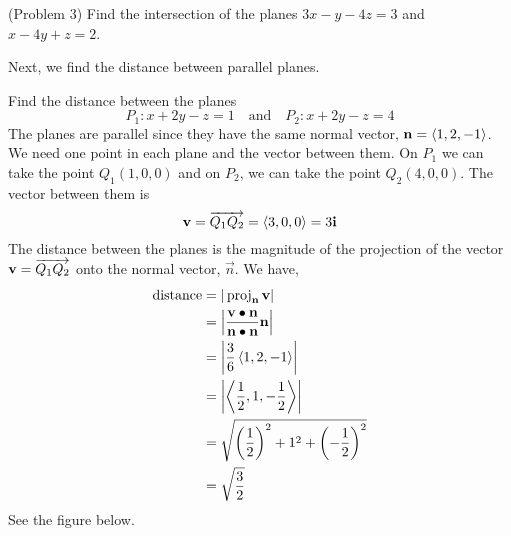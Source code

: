 \documentclass[handout]{ximera}
\begin{document}
\begin{problem}(Problem 3)
Find the intersection of the planes $3x - y -4z = 3$ and $x - 4y + z = 2$.\\
\end{problem}


Next, we find the distance between parallel planes.

\begin{example}[Example 4]
Find the distance between the planes 
\[
P_1: x +2y - z = 1 \quad \text{and} \quad P_2: x+2y-z = 4
\]
The planes are parallel since they have the same normal vector, $\mathbf{n} = \left\langle 1, 2, -1\right\rangle$. 
We need one point in each plane and the vector between them.
On $P_1$ we can take the point $Q_1(1, 0, 0)$ and on $P_2$, we can take the point $Q_2(4, 0, 0)$. 
The vector between them is 
\[
\mathbf{v} = \overrightarrow{Q_1Q_2} = \left\langle 3,0,0\right\rangle = 3\mathbf{i}
\]
The distance between the planes is the magnitude of the projection of the vector $\mathbf{v} = \overrightarrow{Q_1Q_2}$ onto the 
normal vector, $\vec{n}$. We have,
\begin{align*}
\text{distance} &= | \operatorname{proj}_{\mathbf{n}}\mathbf{v}| \\
               &= \left| \frac{\mathbf{v}\bullet \mathbf{n}}{\mathbf{n}\bullet \mathbf{n}} \mathbf{n}\right|\\
               &= \left|\frac{3}{6} \left\langle 1, 2, -1\right\rangle\right|\\
               &= \left| \left\langle \frac12, 1, -\frac12\right\rangle\right|\\
               &= \sqrt{\left( \frac12\right)^2 + 1^2 + \left( -\frac12\right)^2}\\
               & = \sqrt{\frac32}
\end{align*}
See the figure below.

\begin{image}
\end{image}

\end{example}
\end{document}
